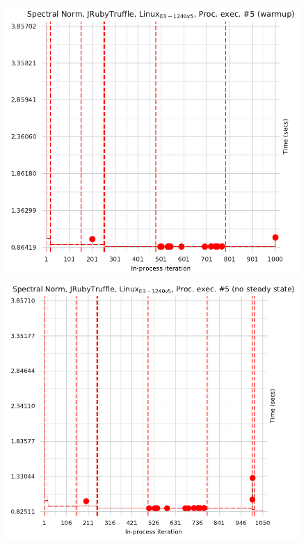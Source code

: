 \documentclass[acmsmall]{acmart}\settopmatter{printfolios=true}
\begin{document}
\begin{figure}[!tbp]
\centering
\begin{minipage}[t]{0.485\textwidth}
\includegraphics[width=\textwidth]{examples/truncated1.pdf}
\end{minipage}
\hfill
\begin{minipage}[t]{0.485\textwidth}
\includegraphics[width=\textwidth]{examples/truncated2.pdf}

\end{minipage}
\end{figure}
\end{document}
